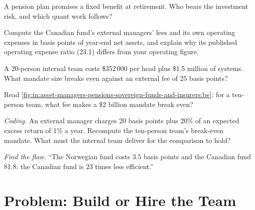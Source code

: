 \begin{exercise}[$\star$]\label{exo:in:asset-managers-pensions-sovereign-funds-and-insurers:3}
A pension plan promises a fixed benefit at retirement. Who bears the investment risk, and which quant work follows?
\end{exercise}

\begin{exercise}[$\star\star$]\label{exo:in:asset-managers-pensions-sovereign-funds-and-insurers:4}
Compute the Canadian fund's external managers' fees and its own operating expenses in basis points of year-end net
assets, and explain why its published operating expense ratio (23.1) differs from your operating figure.
\end{exercise}

\begin{exercise}[$\star\star$]\label{exo:in:asset-managers-pensions-sovereign-funds-and-insurers:5}
A 20-person internal team costs \$352\,000 per head plus \$1.5 million of systems. What mandate size breaks even against an
external fee of 25 basis points?
\end{exercise}

\begin{exercise}[$\star\star$]\label{exo:in:asset-managers-pensions-sovereign-funds-and-insurers:6}
Read \cref{fig:in:asset-managers-pensions-sovereign-funds-and-insurers:be}: for a ten-person team, what fee makes a
\$2 billion mandate break even?
\end{exercise}

\begin{exercise}[$\star\star\star$]\label{exo:in:asset-managers-pensions-sovereign-funds-and-insurers:7}
\emph{Coding.} An external manager charges 20 basis points plus 20\% of an expected excess return of 1\% a year. Recompute
the ten-person team's break-even mandate. What must the internal team deliver for the comparison to hold?
\end{exercise}

\begin{exercise}[$\star\star\star$]\label{exo:in:asset-managers-pensions-sovereign-funds-and-insurers:8}
\emph{Find the flaw.} ``The Norwegian fund costs 3.5 basis points and the Canadian fund 81.8: the Canadian fund is 23 times
less efficient.''
\end{exercise}

\section{Problem: Build or Hire the Team}

